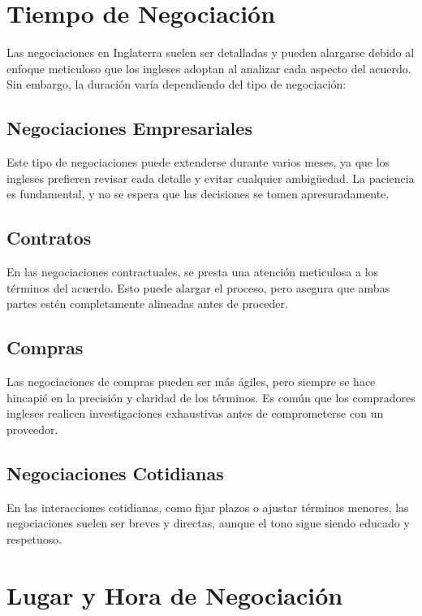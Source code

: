 \documentclass[letterpaper, 12pt]{article}
\begin{document}
\section*{Tiempo de Negociación}

Las negociaciones en Inglaterra suelen ser detalladas y pueden alargarse debido
al enfoque meticuloso que los ingleses adoptan al analizar cada aspecto del
acuerdo. Sin embargo, la duración varía dependiendo del tipo de negociación:

\subsection*{Negociaciones Empresariales}

Este tipo de negociaciones puede extenderse durante varios meses, ya que los
ingleses prefieren revisar cada detalle y evitar cualquier ambigüedad. La
paciencia es fundamental, y no se espera que las decisiones se tomen
apresuradamente.

\subsection*{Contratos}

En las negociaciones contractuales, se presta una atención meticulosa a los
términos del acuerdo. Esto puede alargar el proceso, pero asegura que ambas
partes estén completamente alineadas antes de proceder.

\subsection*{Compras}

Las negociaciones de compras pueden ser más ágiles, pero siempre se hace
hincapié en la precisión y claridad de los términos. Es común que los
compradores ingleses realicen investigaciones exhaustivas antes de
comprometerse con un proveedor.

\subsection*{Negociaciones Cotidianas}

En las interacciones cotidianas, como fijar plazos o ajustar términos menores,
las negociaciones suelen ser breves y directas, aunque el tono sigue siendo
educado y respetuoso.

\section*{Lugar y Hora de Negociación}
\end{document}
